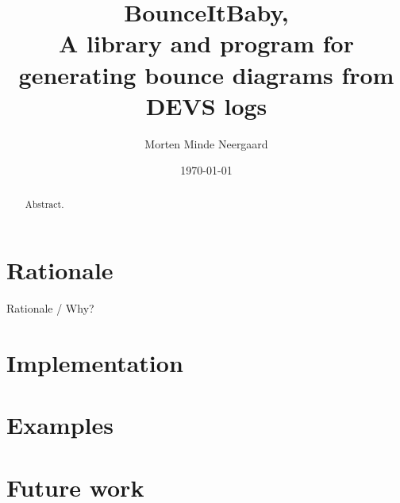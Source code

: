 \documentclass[a4paper]{article}
\author{Morten Minde Neergaard}
\title{BounceItBaby,\\
A library and program for generating bounce diagrams from DEVS logs}
\date{\today}
\begin{document}
\maketitle

\begin{abstract}

Abstract.

\end{abstract}

\section{Rationale}

Rationale / Why?

\section{Implementation}

\section{Examples}

\section{Future work}
\end{document}
